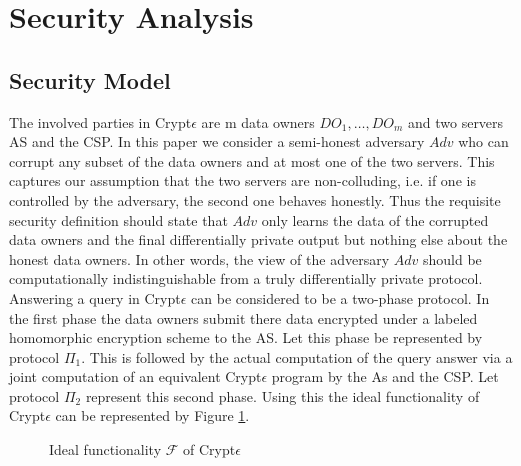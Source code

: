 \section{Security Analysis}
\subsection{Security Model}
The involved parties in Crypt$\epsilon$ are m data owners $DO_1,\ldots, DO_m$ and two servers \textsf{AS} and the \textsf{CSP}. In this paper we consider a
semi-honest adversary  $Adv$ who can corrupt any subset of the data owners and at most one of the two
servers. This captures our assumption that the two servers are non-colluding, i.e. if one is controlled
by the adversary, the second one behaves honestly. Thus the requisite security definition should state that $Adv$ only learns the data of the corrupted data owners and the final differentially private output but nothing else about the honest data owners. In other words, the view of the adversary $Adv$ should be computationally indistinguishable from a truly differentially private protocol.
Answering a query in Crypt$\epsilon$ can be considered to be a two-phase protocol. In the first phase the data owners submit there data encrypted under a labeled homomorphic encryption scheme to the \textsf{AS}. Let this phase be represented by protocol $\Pi_1$. This is followed by the actual computation of the query answer via a joint computation of an equivalent Crypt$\epsilon$ program by the As and the \textsf{CSP}.  Let protocol $\Pi_2$ represent this second phase. Using this the ideal functionality of Crypt$\epsilon$ can be represented by Figure \ref{ideal}. 
 \begin{figure}\noindent
{}  \caption{Ideal functionality $\mathcal{F}$ of Crypt$\epsilon$} \label{ideal} \end{figure}
